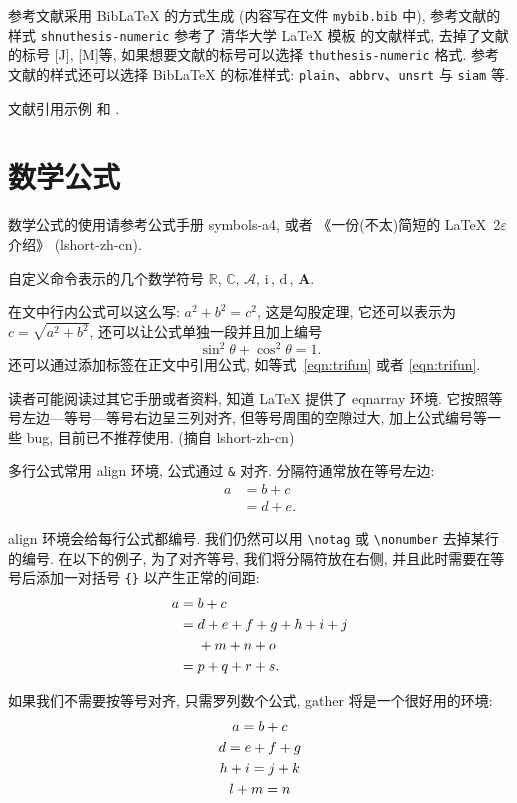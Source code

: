 \documentclass[UTF8,openany,twoside,12pt]{book}
\theoremstyle{plain}
\newcommand{\CC}{\ensuremath{\mathbb{C}}}
\newcommand{\RR}{\ensuremath{\mathbb{R}}}
\newcommand{\A}{\mathcal{A}}
\newcommand{\ii}{\bm{\mathrm{i}}\,}  %
\newcommand{\md}{\mathrm{d}\,}
\newcommand{\bA}{\boldsymbol{A}}
\begin{document}
参考文献采用 BibLaTeX 的方式生成 (内容写在文件 \verb|mybib.bib| 中), 参考文献的样式 \verb|shnuthesis-numeric| 参考了 清华大学 LaTeX 模板 \href{https://github.com/tuna/thuthesis}{} 的文献样式, 去掉了文献的标号 [J], [M]等, 如果想要文献的标号可以选择  \verb|thuthesis-numeric| 格式. 参考文献的样式还可以选择 BibLaTeX 的标准样式: \verb|plain|、\verb|abbrv|、\verb|unsrt| 与 \verb|siam| 等.

文献引用示例 \cite{Adams2003, Tadmor2012}和 \cite{LiLiu1997}.



\section{数学公式}

数学公式的使用请参考公式手册 symbols-a4, 或者 《一份(不太)简短的 \LaTeX~2$\varepsilon$ 介绍》 (lshort-zh-cn).

自定义命令表示的几个数学符号 $\RR$, $\CC$, $\A$, $\ii$, $\md$, $\bA$.

在文中行内公式可以这么写: $a^2+b^2=c^2$, 这是勾股定理, 它还可以表示为 $c=\sqrt{a^2+b^2}$, 还可以让公式单独一段并且加上编号
\begin{equation}\label{eqn:trifun}
\sin^2{\theta}+\cos^2{\theta}=1.
\end{equation}
还可以通过添加标签在正文中引用公式, 如等式~\eqref{eqn:trifun} 或者 \ref{eqn:trifun}.

读者可能阅读过其它手册或者资料, 知道 LaTeX 提供了 eqnarray 环境. 它按照等号左边—等号—等号右边呈三列对齐, 但等号周围的空隙过大, 加上公式编号等一些 bug, 目前已不推荐使用. (摘自 lshort-zh-cn)

多行公式常用 align 环境, 公式通过 \verb|&| 对齐. 分隔符通常放在等号左边:
\begin{align}
a & = b + c \\
& = d + e.
\end{align}

align 环境会给每行公式都编号. 我们仍然可以用 \verb|\notag| 或 \verb|\nonumber| 去掉某行的编号. 在以下的例子,
为了对齐等号, 我们将分隔符放在右侧, 并且此时需要在等号后添加一对括号 \verb|{}| 以产生正常的间距:
\begin{align}
a ={} & b + c \\
={} & d + e + f + g + h + i + j \notag \\
& + m + n + o \\
={} & p + q + r + s.
\end{align}

如果我们不需要按等号对齐, 只需罗列数个公式, gather 将是一个很好用的环境:
\begin{gather}
a = b + c \\
d = e + f + g \\
h + i = j + k \notag \\
l + m = n
\end{gather}
\end{document}
